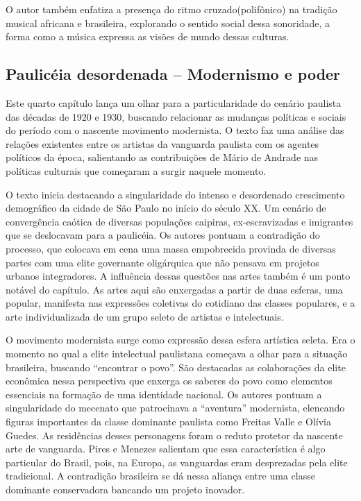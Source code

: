 O autor também enfatiza a presença do ritmo cruzado(polifônico) na
tradição musical africana e brasileira, explorando o sentido social
dessa sonoridade,  a forma como a música expressa as visões de mundo dessas culturas.

\subsection{Paulicéia desordenada -- Modernismo e poder}

Este quarto capítulo lança um olhar para a particularidade do cenário
paulista das décadas de 1920 e 1930, buscando relacionar as mudanças
políticas e sociais do período com o nascente movimento modernista. O
texto faz uma análise das relações existentes entre os artistas da
vanguarda paulista com os agentes políticos da época, salientando as
contribuições de Mário de Andrade nas políticas culturais que começaram
a surgir naquele momento.

O texto inicia destacando a singularidade do intenso e desordenado
crescimento demográfico da cidade de São Paulo no início do século XX.
Um cenário de convergência caótica de diversas populações caipiras,
ex-escravizadas e imigrantes que se deslocavam para a paulicéia. Os
autores pontuam a contradição do processo, que colocava em cena uma
massa empobrecida provinda de diversas partes com uma elite governante
oligárquica que não pensava em projetos urbanos integradores. A
influência dessas questões nas artes também é um ponto notável do
capítulo. As artes aqui são enxergadas a partir de duas esferas, uma
popular, manifesta nas expressões coletivas do cotidiano das classes
populares, e a arte individualizada de um grupo seleto de artistas e
intelectuais.

O movimento modernista surge como expressão dessa esfera artística
seleta. Era o momento no qual a elite intelectual paulistana começava a
olhar para a situação brasileira, buscando ``encontrar o povo''. São
destacadas as colaborações da elite econômica nessa perspectiva que
enxerga os saberes do povo como elementos essenciais na formação de uma
identidade nacional. Os autores pontuam a singularidade do mecenato que
patrocinava a ``aventura'' modernista, elencando figuras importantes da
classe dominante paulista como Freitas Valle e Olívia Guedes. As
residências desses personagens foram o reduto protetor da nascente arte
de vanguarda. Pires e Menezes salientam que essa característica é algo
particular do Brasil, pois, na Europa, as vanguardas eram desprezadas
pela elite tradicional. A contradição brasileira se dá nessa aliança
entre uma classe dominante conservadora bancando um projeto inovador.

